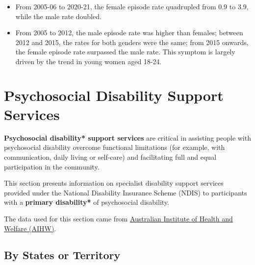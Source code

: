 \documentclass[
  a4paper,
  DIV=11,
  numbers=noendperiod]{scrreport}
\begin{document}
\begin{itemize}
\item
  From 2005-06 to 2020-21, the female episode rate quadrupled from 0.9
  to 3.9, while the male rate doubled.
\item
  From 2005 to 2012, the male episode rate was higher than females;
  between 2012 and 2015, the rates for both genders were the same; from
  2015 onwards, the female episode rate surpassed the male rate. This
  symptom is largely driven by the trend in young women aged 18-24.
\end{itemize}


\hypertarget{psychosocial-disability-support-services}{%
\chapter{Psychosocial Disability Support
Services}\label{psychosocial-disability-support-services}}

\textbf{Psychosocial disability* support services} are critical in
assisting people with psychosocial disability overcome functional
limitations (for example, with communication, daily living or self-care)
and facilitating full and equal participation in the community.

This section presents information on specialist disability support
services provided under the National Disability Insurance Scheme (NDIS)
to participants with a \textbf{primary disability*} of psychosocial
disability.

The data used for this section came from
\href{https://www.aihw.gov.au/mental-health/topic-areas/psychosocial-disability-support}{Australian
Institute of Health and Welfare (AIHW)}.

\hypertarget{by-states-or-territory}{%
\section{By States or Territory}\label{by-states-or-territory}}
\end{document}
